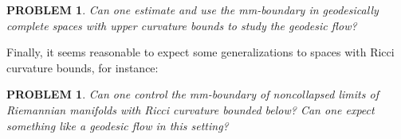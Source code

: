 \documentclass[12pt,leqno]{amsart}
\numberwithin{equation}{section}
\newtheorem{quest}[thm]{PROBLEM}
\theoremstyle{definition}
\theoremstyle{remark}
\begin{document}
  
\begin{quest}  \label{qe:CAT}
Can one estimate and use the mm-boundary in geodesically complete spaces with upper curvature bounds to study the geodesic flow?
\end{quest}

Finally, it seems reasonable to expect some generalizations to spaces with Ricci curvature bounds, for instance:


\begin{quest}
Can one control the mm-boundary of noncollapsed limits of Riemannian manifolds with Ricci curvature bounded below? Can one expect something like a geodesic flow in this setting? 
\end{quest}



\end{document}
